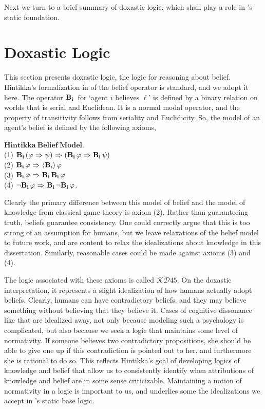 Next we turn to a brief summary of doxastic logic, which shall play a role in \DASL's static foundation. 

\section{Doxastic Logic}
This section presents doxastic logic, the logic for reasoning about belief. Hintikka's formalization in \cite{Hintikka} of the belief operator is standard, and we adopt it here. The operator $\mathbf{B}_{\mathbf{i}}\,$ for `agent $i$ believes $\ell$' is defined by a binary relation on worlds that is serial and Euclidean. It is a normal modal operator, and the property of transitivity follows from seriality and Euclidicity. So, the model of an agent's belief is defined by the following axioms,

$\mathbf{Hintikka\ Belief\ Model}$.\\
(1) $\mathbf{B}_{\mathbf{i}}\,(\varphi {\ \Rightarrow \ } \psi) {\ \Rightarrow \ } (\mathbf{B}_{\mathbf{i}}\,\varphi {\ \Rightarrow \ } \mathbf{B}_{\mathbf{i}}\,\psi)$\\
(2) $\mathbf{B}_{\mathbf{i}}\,\varphi {\ \Rightarrow \ } \langle \mathbf{B}_{i} \rangle\,\varphi$\\
(3) $\mathbf{B}_{\mathbf{i}}\,\varphi {\ \Rightarrow \ } \mathbf{B}_{\mathbf{i}}\,\mathbf{B}_{\mathbf{i}}\,\varphi$\\
(4) ${\neg} \mathbf{B}_{\mathbf{i}}\,\varphi {\ \Rightarrow \ } \mathbf{B}_{\mathbf{i}}\,{\neg}\mathbf{B}_{\mathbf{i}}\,\varphi$.

Clearly the primary difference between this model of belief and the model of knowledge from classical game theory is axiom (2). Rather than guaranteeing truth, beliefs guarantee consistency. One could correctly argue that this is too strong of an assumption for humans, but we leave relaxations of the belief model to future work, and are content to relax the idealizations about knowledge in this dissertation. Similarly, reasonable cases could be made against axioms (3) and (4).

The logic associated with these axioms is called $\mathcal{KD}\mathit{45}$. On the doxastic interpretation, it represents a slight idealization of how humans actually adopt beliefs. Clearly, humans can have contradictory beliefs, and they may believe something without believing that they believe it. Cases of cognitive dissonance like that are idealized away, not only because modeling such a psychology is complicated, but also because we seek a logic that maintains some level of normativity. If someone believes two contradictory propositions, she should be able to give one up if this contradiction is pointed out to her, and furthermore she is rational to do so. This reflects Hintikka's goal of developing logics of knowledge and belief that allow us to consistently identify when attributions of knowledge and belief are in some sense criticizable. Maintaining a notion of normativity in a logic is important to us, and underlies some the idealizations we accept in \DASL's static base logic.

